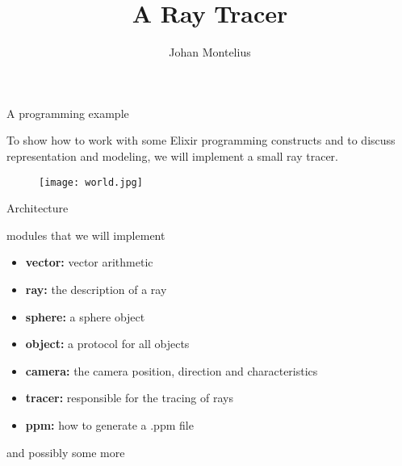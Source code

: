 

\title[ID1019 Ray Tracer]{A Ray Tracer}
 
 
\author{Johan Montelius}
\date{\semester}



\begin{frame}
\titlepage
\end{frame}

\begin{frame}{A programming example}

To show how to work with some Elixir programming constructs and to
discuss representation and modeling, we will implement a small ray tracer. 

\pause \vspace{20pt}

\begin{figure}
 \texttt{[image: world.jpg]}
\end{figure}

\end{frame}

\begin{frame}{Architecture}

modules that we will implement

\begin{itemize}
 \item {\bf vector:} vector arithmetic
 \item {\bf ray:} the description of a ray
 \item {\bf sphere:} a sphere object
 \item {\bf object:} a protocol for all objects
 \item {\bf camera:} the camera position, direction and characteristics
 \item {\bf tracer:} responsible for the tracing of rays 
 \item {\bf ppm:} how to generate a .ppm file
\end{itemize}

\pause and possibly some more

\end{frame}

